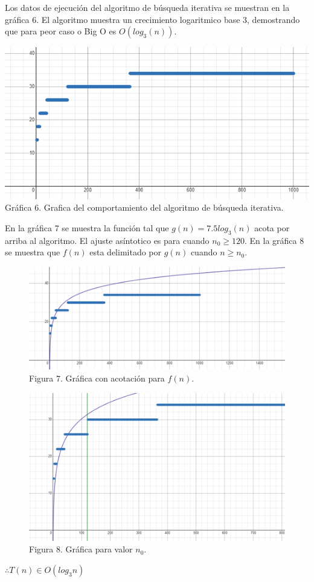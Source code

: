 \documentclass[12pt,twoside]{article}
\begin{document}
Los datos de ejecución del algoritmo de búsqueda iterativa se muestran en la gráfica 6. El algoritmo muestra un
crecimiento logaritmico base 3, demostrando que para peor caso o Big O es
$O(log_3(n))$.

\medskip

\begin{minipage}{\linewidth}
  \centering
  \includegraphics[width=0.7\linewidth]{images/busquedaiterativaworscase.png}
  \\
  Gráfica 6. Grafica del comportamiento del algoritmo de búsqueda iterativa.
\end{minipage}
\newpage

En la gráfica 7 se muestra la función tal que $g(n)=7.5log_3(n)$ acota por arriba al algoritmo. El ajuste asíntotico es para cuando $n_0\geq 120$. En la gráfica 8 se muestra que $f(n)$ esta delimitado por $g(n)$ cuando $n\geq n_0$.
\medskip
\begin{figure}[h]
  \begin{center}
    \includegraphics[width=0.7\linewidth]{images/busquedaiterativaworscasegn.png}
    \\
    Figura 7. Gráfica con acotación para $f(n)$.
  \end{center}
\end{figure}
\begin{figure}[h]
  \begin{center}
    \includegraphics[width=0.7\linewidth]{images/busquedaiterativaworscasegnacotado.png}
    \\
    Figura 8. Gráfica para valor $n_0$.
  \end{center}
\end{figure}
\begin{center}
  $\therefore T(n)\in O(log_3n)$
\end{center}
\end{document}
